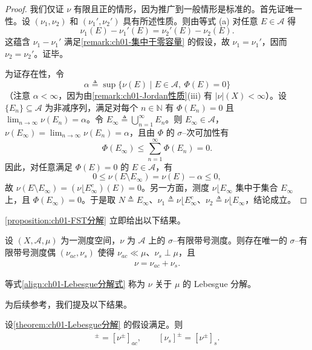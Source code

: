 \documentclass[../../main.tex]{subfiles}%
\begin{document}
\begin{proof}
我们仅证 $\nu$ 有限且正的情形，因为推广到一般情形是标准的。首先证唯一性。设 $(\nu_1,\nu_2)$ 和 $(\nu_1',\nu_2')$ 具有所述性质。则由等式 (a) 对任意 $E\in\mathcal{A}$ 得
\[
\nu_1(E)-\nu_1'(E)=\nu_2'(E)-\nu_2(E).
\]
这蕴含 $\nu_1-\nu_1'$ 满足\cref{remark:ch01-集中于零容量} 的假设，故 $\nu_1=\nu_1'$，因而 $\nu_2=\nu_2'$。证毕。

为证存在性，令
\[
\alpha\triangleq \sup\{\nu(E)\mid E\in\mathcal{A},\ \Phi(E)=0\}
\]
（注意 $\alpha<\infty$，因为由\cref{remark:ch01-Jordan性质}(iii) 有 $|\nu|(X)<\infty$）。设 $\{E_n\}\subseteq\mathcal{A}$ 为非减序列，满足对每个 $n\in\mathbb{N}$ 有 $\Phi(E_n)=0$ 且 $\lim_{n\to\infty}\nu(E_n)=\alpha$。令 $E_\infty\triangleq \bigcup_{n=1}^\infty E_n$。则 $E_\infty\in\mathcal{A}$，$\nu(E_\infty)=\lim_{n\to\infty}\nu(E_n)=\alpha$，且由 $\Phi$ 的 $\sigma$--次可加性有
\[
\Phi(E_\infty)\leqslant\sum_{n=1}^\infty\Phi(E_n)=0.
\]
因此，对任意满足 $\Phi(E)=0$ 的 $E\in\mathcal{A}$，有
\[
0\leqslant\nu(E\setminus E_\infty)=\nu(E)-\alpha\leqslant 0,
\]
故 $\nu(E\setminus E_\infty)=(\nu\lfloor E_\infty^c)(E)=0$。另一方面，测度 $\nu\lfloor E_\infty$ 集中于集合 $E_\infty$ 上，且 $\Phi(E_\infty)=0$。于是取 $N\triangleq E_\infty$、$\nu_1\triangleq \nu\lfloor E_\infty^c$、$\nu_2\triangleq \nu\lfloor E_\infty$，结论成立。
\end{proof}

\cref{proposition:ch01-FST分解} 立即给出以下结果。

\begin{theorem}[Lebesgue]\label{theorem:ch01-Lebesgue分解}
设 $(X,\mathcal{A},\mu)$ 为一测度空间，$\nu$ 为 $\mathcal{A}$ 上的 $\sigma$--有限带号测度。则存在唯一的 $\sigma$--有限带号测度偶 $(\nu_{ac},\nu_s)$ 使得 $\nu_{ac}\ll\mu$、$\nu_s\perp\mu$，且
\begin{align}
\nu=\nu_{ac}+\nu_s. \label{align:ch01-Lebesgue分解式}
\end{align}
\end{theorem}

\begin{definition}\label{definition:ch01-Lebesgue分解定义}\label{definition:ch01-Lebesgue分解}
等式\eqref{align:ch01-Lebesgue分解式} 称为 $\nu$ 关于 $\mu$ 的 Lebesgue 分解。
\end{definition}

为后续参考，我们提及以下结果。

\begin{lemma}\label{lemma:ch01-Lebesgue分解正负部}
设\cref{theorem:ch01-Lebesgue分解} 的假设满足。则
\begin{align}
[\nu_{ac}]^\pm=[\nu^\pm]_{ac},\qquad [\nu_s]^\pm=[\nu^\pm]_s. \label{align:ch01-Lebesgue分解正负部}
\end{align}
\end{lemma}
\end{document}

